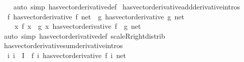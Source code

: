 \begin{isabellebody}
%
\isadelimproof
\ \ %
\endisadelimproof
%
\isatagproof
{}\isamarkupfalse%
\ {\isacharparenleft}{\kern0pt}auto\ simp{\isacharcolon}{\kern0pt}\ has{\isacharunderscore}{\kern0pt}vector{\isacharunderscore}{\kern0pt}derivative{\isacharunderscore}{\kern0pt}def{\isacharparenright}{\kern0pt}%
\endisatagproof
{\isafoldproof}%
%
\isadelimproof
\isanewline
%
\endisadelimproof
\isanewline
{}\isamarkupfalse%
\ has{\isacharunderscore}{\kern0pt}vector{\isacharunderscore}{\kern0pt}derivative{\isacharunderscore}{\kern0pt}add{\isacharbrackleft}{\kern0pt}derivative{\isacharunderscore}{\kern0pt}intros{\isacharbrackright}{\kern0pt}{\isacharcolon}{\kern0pt}\isanewline
\ \ {\isachardoublequoteopen}{\isacharparenleft}{\kern0pt}f\ has{\isacharunderscore}{\kern0pt}vector{\isacharunderscore}{\kern0pt}derivative\ f{\isacharprime}{\kern0pt}{\isacharparenright}{\kern0pt}\ net\ {\isasymLongrightarrow}\ {\isacharparenleft}{\kern0pt}g\ has{\isacharunderscore}{\kern0pt}vector{\isacharunderscore}{\kern0pt}derivative\ g{\isacharprime}{\kern0pt}{\isacharparenright}{\kern0pt}\ net\ {\isasymLongrightarrow}\isanewline
\ \ \ \ {\isacharparenleft}{\kern0pt}{\isacharparenleft}{\kern0pt}{\isasymlambda}x{\isachardot}{\kern0pt}\ f\ x\ {\isacharplus}{\kern0pt}\ g\ x{\isacharparenright}{\kern0pt}\ has{\isacharunderscore}{\kern0pt}vector{\isacharunderscore}{\kern0pt}derivative\ {\isacharparenleft}{\kern0pt}f{\isacharprime}{\kern0pt}\ {\isacharplus}{\kern0pt}\ g{\isacharprime}{\kern0pt}{\isacharparenright}{\kern0pt}{\isacharparenright}{\kern0pt}\ net{\isachardoublequoteclose}\isanewline
%
\isadelimproof
\ \ %
\endisadelimproof
%
\isatagproof
{}\isamarkupfalse%
\ {\isacharparenleft}{\kern0pt}auto\ simp{\isacharcolon}{\kern0pt}\ has{\isacharunderscore}{\kern0pt}vector{\isacharunderscore}{\kern0pt}derivative{\isacharunderscore}{\kern0pt}def\ scaleR{\isacharunderscore}{\kern0pt}right{\isacharunderscore}{\kern0pt}distrib{\isacharparenright}{\kern0pt}%
\endisatagproof
{\isafoldproof}%
%
\isadelimproof
\isanewline
%
\endisadelimproof
\isanewline
{}\isamarkupfalse%
\ has{\isacharunderscore}{\kern0pt}vector{\isacharunderscore}{\kern0pt}derivative{\isacharunderscore}{\kern0pt}sum{\isacharbrackleft}{\kern0pt}derivative{\isacharunderscore}{\kern0pt}intros{\isacharbrackright}{\kern0pt}{\isacharcolon}{\kern0pt}\isanewline
\ \ {\isachardoublequoteopen}{\isacharparenleft}{\kern0pt}{\isasymAnd}i{\isachardot}{\kern0pt}\ i\ {\isasymin}\ I\ {\isasymLongrightarrow}\ {\isacharparenleft}{\kern0pt}f\ i\ has{\isacharunderscore}{\kern0pt}vector{\isacharunderscore}{\kern0pt}derivative\ f{\isacharprime}{\kern0pt}\ i{\isacharparenright}{\kern0pt}\ net{\isacharparenright}{\kern0pt}\ {\isasymLongrightarrow}\isanewline

\end{isabellebody}
